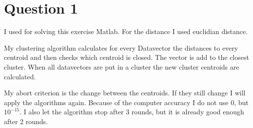 \section*{Question 1}
I used for solving this exercise Matlab. For the distance I used euclidian
distance.

My clustering algorithm calculates for every Datavector the distances to
every centroid and then checks which centroid is closed. The vector is add to
the closest cluster. When all datavectors are put in a cluster the new cluster
centroids are calculated. 

My abort criterion is the change between the centroids. If they still change I
will apply the algorithms again. Because of the computer accuracy I do not use
0, but $10^{-15}$. I also let the algorithm stop after 3 rounds, but it is
already good enough after 2 rounds.


